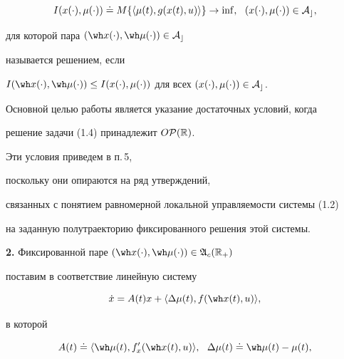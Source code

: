 \begin{equation}


I(x(\cdot),\mu(\cdot))\doteq M\{\langle\mu(t),g(x(t),u)\rangle \}\to\inf,


\ \ (x(\cdot),\mu(\cdot))\in\cal A_c,


\end{equation}


для которой пара $(\wh x(\cdot),\wh\mu(\cdot))\in\cal A_c$


называется решением, если


$I(\wh x(\cdot),\wh\mu(\cdot))\le


I(x(\cdot),\mu(\cdot))$ для всех $(x(\cdot),\mu(\cdot))\in\cal A_c$.





Основной целью работы является указание достаточных условий, когда


решение задачи (1.4) принадлежит $O\cal P(\Bbb R)$.


Эти условия приведем в п.\,5,


поскольку они опираются на ряд утверждений,


связанных с понятием равномерной локальной управляемости системы (1.2)


на заданную полутраекторию фиксированного решения этой системы. 


\medskip


\addtocounter{section}{1}


\setcounter{equation}{0}


\setcounter{thms}{0}


\setcounter{lems}{0}


\setcounter{cors}{0}


\setcounter{notes}{0}


\setcounter{defns}{0}





{\bf 2.} Фиксированной паре $(\wh x(\cdot),\wh \mu(\cdot))\in


\frak A_c(\bR_{+})$


поставим в соответствие линейную систему


\begin{equation}


\Dot x=A(t)x+\langle\Delta\mu(t),f(\wh x(t),u)\rangle,


\end{equation}


в которой


\begin{equation}


A(t)\doteq\langle\wh\mu(t),f'_{x}(\wh x(t),u)\rangle,


\ \ \Delta\mu(t)\doteq\wh\mu(t)-\mu(t),


\end{equation}


